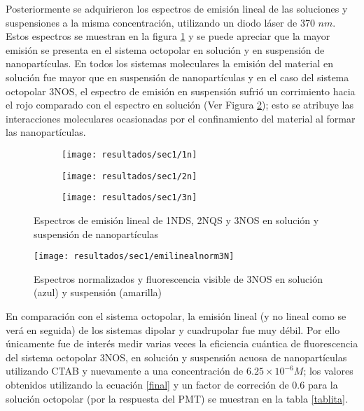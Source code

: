 Posteriormente se adquirieron los espectros de emisi\'on lineal de las soluciones y suspensiones a la misma concentraci\'on, utilizando un diodo l\'aser de 370 $nm$. Estos espectros se muestran en la figura \ref{los3espemilineal} y se puede apreciar que la mayor emisi\'on se presenta en el sistema octopolar en soluci\'on y en suspensi\'on de nanopart\'iculas. En todos los sistemas moleculares la emisi\'on del material en soluci\'on fue mayor que en suspensi\'on de nanopart\'iculas y en el caso del sistema octopolar 3NOS, el espectro de emisi\'on en suspensi\'on sufri\'o un corrimiento hacia el rojo comparado con el espectro en soluci\'on (Ver Figura \ref{3nsolsusp}); esto se atribuye las interacciones moleculares ocasionadas por el confinamiento del material al formar las nanopart\'iculas.  



\begin{figure}
\centering
\begin{subfigure}{\textwidth}
\centering
\texttt{[image: resultados/sec1/1n]}
\end{subfigure}
\begin{subfigure}{\textwidth}
\centering
\texttt{[image: resultados/sec1/2n]}
\end{subfigure}
\begin{subfigure}{\textwidth}
\centering
\texttt{[image: resultados/sec1/3n]}
\end{subfigure}
\caption{Espectros de emisi\'on lineal de 1NDS, 2NQS y 3NOS en soluci\'on y suspensi\'on de nanopart\'iculas}
\label{los3espemilineal}
\end{figure}



\begin{figure}[h]
\centering
\texttt{[image: resultados/sec1/emilinealnorm3N]}
\caption{Espectros normalizados y fluorescencia visible de 3NOS en soluci\'on (azul) y suspensi\'on (amarilla)}\label{3nsolsusp}
\end{figure}


En comparaci\'on con el sistema octopolar, la emisi\'on lineal (y no lineal como se ver\'a en seguida) de los sistemas dipolar y cuadrupolar fue muy d\'ebil. Por ello \'unicamente fue de inter\'es medir varias veces la eficiencia cu\'antica de fluorescencia del sistema octopolar 3NOS, en soluci\'on y suspensi\'on acuosa de nanopart\'iculas utilizando CTAB y nuevamente a una concentraci\'on de $6.25 \times 10^{-6} M$; los valores obtenidos utilizando la ecuaci\'on \ref{final} y un factor de correci\'on de 0.6 para la soluci\'on octopolar (por la respuesta del PMT) se muestran en la tabla \ref{tablita}. 

